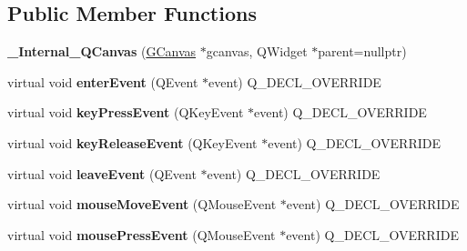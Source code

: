 \subsection*{Public Member Functions}
\begin{DoxyCompactItemize}
\item 
\mbox{\label{class__Internal__QCanvas_a5b9a7da6a12ba9eb8ac09bc9c9a6d53b}} 
{\bfseries \+\_\+\+Internal\+\_\+\+Q\+Canvas} (\mbox{\hyperlink{classGCanvas}{G\+Canvas}} $\ast$gcanvas, Q\+Widget $\ast$parent=nullptr)
\item 
\mbox{\label{class__Internal__QCanvas_a3042d4cda0e40723913b30ddee47172e}} 
virtual void {\bfseries enter\+Event} (Q\+Event $\ast$event) Q\+\_\+\+D\+E\+C\+L\+\_\+\+O\+V\+E\+R\+R\+I\+DE
\item 
\mbox{\label{class__Internal__QCanvas_a29198813696d21513a47dc9eb34800ae}} 
virtual void {\bfseries key\+Press\+Event} (Q\+Key\+Event $\ast$event) Q\+\_\+\+D\+E\+C\+L\+\_\+\+O\+V\+E\+R\+R\+I\+DE
\item 
\mbox{\label{class__Internal__QCanvas_a4d7815577a32856080e88de4644a1d86}} 
virtual void {\bfseries key\+Release\+Event} (Q\+Key\+Event $\ast$event) Q\+\_\+\+D\+E\+C\+L\+\_\+\+O\+V\+E\+R\+R\+I\+DE
\item 
\mbox{\label{class__Internal__QCanvas_a0e33cfe52db23428384b41684fe0fe99}} 
virtual void {\bfseries leave\+Event} (Q\+Event $\ast$event) Q\+\_\+\+D\+E\+C\+L\+\_\+\+O\+V\+E\+R\+R\+I\+DE
\item 
\mbox{\label{class__Internal__QCanvas_ab644cd3614ced94628ed4856638787af}} 
virtual void {\bfseries mouse\+Move\+Event} (Q\+Mouse\+Event $\ast$event) Q\+\_\+\+D\+E\+C\+L\+\_\+\+O\+V\+E\+R\+R\+I\+DE
\item 
\mbox{\label{class__Internal__QCanvas_a2288795ece394ac45646604af1eb3962}} 
virtual void {\bfseries mouse\+Press\+Event} (Q\+Mouse\+Event $\ast$event) Q\+\_\+\+D\+E\+C\+L\+\_\+\+O\+V\+E\+R\+R\+I\+DE
\item 
\mbox{\label{class__Internal__QCanvas_a629b39b56e7a035b25c229aea5f581f8}} 

\end{DoxyCompactItemize}
